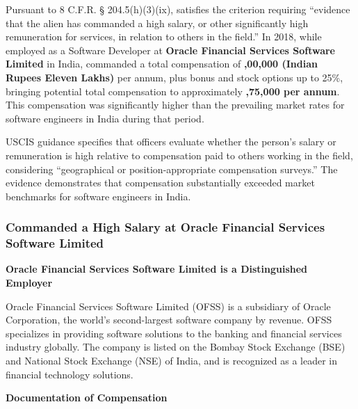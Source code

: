 

Pursuant to 8 C.F.R. § 204.5(h)(3)(ix), \dr satisfies the criterion requiring ``evidence that the alien has commanded a high salary, or other significantly high remuneration for services, in relation to others in the field.'' In 2018, while employed as a Software Developer at \textbf{Oracle Financial Services Software Limited} in India, \dr commanded a total compensation of \textbf{,00,000 (Indian Rupees Eleven Lakhs)} per annum, plus bonus and stock options up to 25\%, bringing potential total compensation to approximately \textbf{,75,000 per annum}. This compensation was significantly higher than the prevailing market rates for software engineers in India during that period.

USCIS guidance specifies that officers evaluate whether the person's salary or remuneration is high relative to compensation paid to others working in the field, considering ``geographical or position-appropriate compensation surveys.'' The evidence demonstrates that \drs compensation substantially exceeded market benchmarks for software engineers in India.


\subsubsection{\dr Commanded a High Salary at Oracle Financial Services Software Limited}
\label{salary:oracle}

\textbf{Oracle Financial Services Software Limited is a Distinguished Employer}

Oracle Financial Services Software Limited (OFSS) is a subsidiary of Oracle Corporation, the world's second-largest software company by revenue. OFSS specializes in providing software solutions to the banking and financial services industry globally. The company is listed on the Bombay Stock Exchange (BSE) and National Stock Exchange (NSE) of India, and is recognized as a leader in financial technology solutions.

\textbf{Documentation of \drs Compensation}

